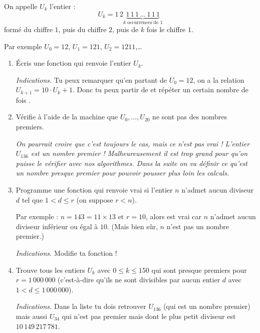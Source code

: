 \documentclass[11pt,class=report,crop=false]{standalone}
\begin{document}

\begin{activite}


On appelle $U_k$ l'entier :
$$U_k = 1\,2 \underbrace{1\,1\,1\,\ldots\,1\,1\,1}_{k \text{ occurrences de } 1}$$
formé du chiffre $1$, puis du chiffre $2$, puis de $k$ fois le chiffre $1$.

Par exemple $U_0 = 12$, $U_1 = 121$, $U_2 = 1211$,\ldots




\begin{enumerate}
  \item \'Ecris une fonction  qui renvoie l'entier $U_k$.
  
  \emph{Indications.} Tu peux remarquer qu'en partant de $U_0=12$, on a la relation
  $U_{k+1} = 10 \cdot U_k + 1$. Donc tu peux partir de  et répéter un certain nombre de fois .
  
  \item Vérifie à l'aide de la machine que $U_0,\ldots,U_{20}$ ne sont pas des nombres premiers. 
  
  \medskip
  
 \emph{On pourrait croire que c'est toujours le cas, mais ce n'est pas vrai ! L'entier $U_{136}$ est un nombre premier ! Malheureusement il est trop grand pour qu'on puisse le vérifier avec nos algorithmes. Dans la suite on va définir ce qu'est un \emph{nombre presque premier} pour pouvoir pousser plus loin les calculs.}
  
  \item Programme une fonction  qui renvoie \og{}vrai\fg{} si l'entier $n$ n'admet aucun diviseur $d$ tel que $1< d \le r$ (on suppose $r<n$). 
  
  Par exemple : $n = 143 = 11 \times 13$ et $r=10$, alors  est
  \og{}vrai\fg{} car $n$ n'admet aucun diviseur inférieur ou égal à $10$. (Mais bien sûr, $n$ n'est pas un nombre premier.)
  
  \emph{Indications.} Modifie ta fonction  !
  
  \item Trouve tous les entiers $U_k$ avec $0\le k \le 150$ qui sont presque premiers pour 
  $r = 1 \,000\,000$ (c'est-à-dire qu'ils ne sont divisibles par aucun entier $d$ avec $1<d \le 1\,000\,000$).
  
  \emph{Indications.} Dans la liste tu dois retrouver $U_{136}$ (qui est un nombre premier) mais aussi $U_{34}$ qui n'est pas premier mais dont le plus petit diviseur est
  $10\,149\,217\,781$.
\end{enumerate}   
     
\end{activite}
\end{document}
